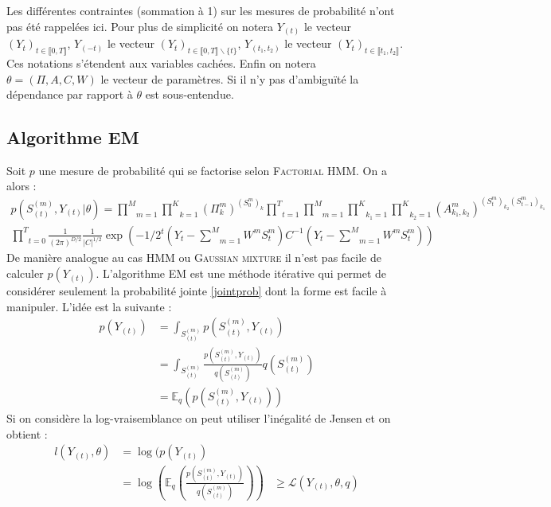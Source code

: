 \documentclass[10pt,a4paper]{article}
\newcommand{\hmm}{\textsc{HMM}}
\newcommand{\fhmm}{\textsc{Factorial HMM}}
\newcommand{\EM}{\textsc{EM}}
\begin{document}
Les différentes contraintes (sommation à 1) sur les mesures de probabilité 
n'ont pas été rappelées ici. Pour plus de simplicité on notera $Y_{(t)}$ le 
vecteur $(Y_t)_{t \in \llbracket 0,T \rrbracket}$, $Y_{(-t)}$ le vecteur 
$(Y_{t})_{t \in \llbracket 0,T \rrbracket\backslash \lbrace t \rbrace}$, 
$Y_{(t_1,t_2)}$ le vecteur $(Y_t)_{t \in \llbracket t_1,t_2 \rrbracket}$. Ces 
notations s'étendent aux variables cachées. Enfin on notera $\theta=(\Pi, 
A,C,W)$ le vecteur de paramètres. Si il n'y pas d'ambiguïté la dépendance 
par rapport à $\theta$ est sous-entendue.

\subsection{Algorithme EM}
Soit $p$ une mesure de probabilité qui se factorise selon \fhmm. On a alors :
\begin{multline}
p(S_{(t)}^{(m)},Y_{(t)} \vert 
\theta)=\underset{m=1}{\overset{M}{\prod}}\underset{k=1}{\overset{K}{\prod}}
(\Pi_k^m)^{(S_0^m)_k}\underset{t=1}{\overset{T}{\prod}}\underset{m=1}{\overset{M
}{\prod}}\underset{k_1=1}{\overset{K}{\prod}}\underset{k_2=1}{\overset{K}{\prod}
}(A_{k_1,k_2}^m)^{(S_t^m)_{k_2}(S_{t-1}^m)_{k_1}}\\ 
\underset{t=0}{\overset{T}{\prod}}\frac{1}{(2\pi)^{D/2}}\frac{1}{\vert C  
\vert^{1/2}}\exp\left(-1/2 {}^t\left(Y_t- \underset{m=1}{\overset{M}{\sum}}W^m 
S_t^m \right)C^{-1} \left(Y_t- \underset{m=1}{\overset{M}{\sum}}W^m S_t^m 
\right)\right) \label{jointprob}
\end{multline}
De manière analogue au cas \hmm{} ou \textsc{Gaussian mixture} il n'est pas 
facile de calculer $p(Y_{(t)})$. L'algorithme \EM{} est une méthode itérative 
qui 
permet de considérer seulement la probabilité jointe \ref{jointprob} dont la 
forme est facile à manipuler. L'idée est la suivante :
\begin{equation}
\begin{aligned}
p(Y_{(t)})&=\int_{S_{(t)}^{(m)}}p(S_{(t)}^{(m)},Y_{(t)}) \\
&=\int_{S_{(t)}^{(m)}}\frac{p(S_{(t)}^{(m)},Y_{(t)})}{q(S_{(t)}^{(m)})}q(S_{(t)}
^{(m)}) \\
&=\mathbb{E}_q\left(p(S_{(t)}^{(m)},Y_{(t)}) \right)
\end{aligned}
\end{equation}
Si on considère la log-vraisemblance on peut utiliser l'inégalité de Jensen et 
on obtient :
\begin{equation}
\begin{aligned}
l(Y_{(t)},\theta)&=\log(p(Y_{(t)}) \\
&=\log\left( \mathbb{E}_q\left( 
\frac{p(S_{(t)}^{(m)},Y_{(t)})}{q(S_{(t)}^{(m)})} \right) \right)
&\ge \mathcal{L}(Y_{(t)},\theta,q)
\end{aligned}
\end{equation}
\end{document}
